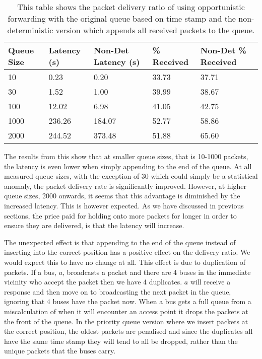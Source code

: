         \begin{table}
            \begin{tabularx}{\linewidth}{|X|X|X|X|X|}
                \hline
                \multicolumn{1}{|X|}{\centering Queue Size} & 
                \multicolumn{1}{|X|}{\centering Latency (s)} & 
                \multicolumn{1}{|X|}{\centering Non-Det Latency (s)} & 
                \multicolumn{1}{|X|}{\centering \% Received} & 
                \multicolumn{1}{|X|}{\centering Non-Det \% Received} \\
                \hline
                10 & 0.23 & 0.20 & 33.73 & 37.71 \\
                30 & 1.52 & 1.00 & 39.99 & 38.67 \\
                100 & 12.02 & 6.98 & 41.05 & 42.75 \\
                1000 & 236.26 & 184.07 & 52.77 & 58.86 \\
                2000 & 244.52 & 373.48 & 51.88 & 65.60 \\
                \hline
            \end{tabularx}
            \caption{This table shows the packet delivery ratio of using opportunistic forwarding with the original queue based on time stamp  and the non-deterministic version which appends all received packets to the queue.}
            \label{tab:priority_queue}
        \end{table}

        \missingfigure{}

        The results from this show that at smaller queue sizes, that is 10-1000 packets, the latency is even lower when simply appending to the end of the queue. At all measured queue sizes, with the exception of 30 which could simply be a statistical anomaly, the packet delivery rate is significantly improved. However, at higher queue sizes, 2000 onwards, it seems that this advantage is diminished by the increased latency. This is however expected. As we have discussed in previous sections, the price paid for holding onto more packets for longer in order to ensure they are delivered, is that the latency will increase. 

        The unexpected effect is that appending to the end of the queue instead of inserting into the correct position has a positive effect on the delivery ratio. We would expect this to have no change at all. This effect is due to duplication of packets. If a bus, $a$, broadcasts a packet and there are 4 buses in the immediate vicinity who accept the packet then we have 4 duplicates. $a$ will receive a response and then move on to broadcasting the next packet in the queue, ignoring that 4 buses have the packet now. When a bus gets a full queue from a miscalculation of when it will encounter an access point it drops the packets at the front of the queue. In the priority queue version where we insert packets at the correct position, the oldest packets are penalised and since the duplicates all have the same time stamp they will tend to all be dropped, rather than the unique packets that the buses carry. 

